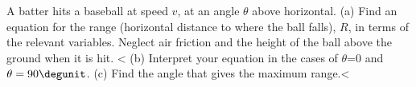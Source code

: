 A batter hits a baseball at speed
        $v$, at an angle $\theta$ above horizontal.\hwendpart
        (a) Find an equation for the range (horizontal distance to
        where the ball falls), $R$, in terms of the relevant variables. Neglect air friction
        and the height of the ball above the ground when it is hit.
        <%
        (b) Interpret your equation in the cases of $\theta$=0 and $\theta=90\degunit$.\hwendpart
        (c) Find the angle that gives the maximum range.<%
